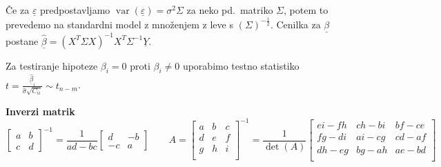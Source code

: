 \documentclass[11pt,a4paper]{amsart}
\theoremstyle{definition} %
\theoremstyle{plain} %
\newcommand{\Y}{\underline{Y}}
\newcommand{\ubeta}{\ensuremath{\underline{\beta}}}
\newcommand{\ueps}{\ensuremath{\underline{\varepsilon}}}
\DeclareMathOperator{\var}{var}
\begin{document}
Če za $\ueps$ predpostavljamo $\var(\ueps) = \sigma^2\Sigma$ za neko pd.\
matriko $\Sigma$, potem to prevedemo na standardni model z množenjem z leve s
$(\Sigma)^{-\frac12}$. Cenilka za $\ubeta$ postane $\hat{\ubeta} =
(X^T\Sigma X)^{-1}X^T\Sigma^{-1} \Y$.

Za testiranje hipoteze $\beta_i = 0$ proti $\beta_i \neq 0$ uporabimo testno
statistiko $t = \frac{\hat{\ubeta}_i}{\hat{\sigma} \sqrt{C_{ii}}} \sim t_{n-m}$.

\textbf{Inverzi matrik}
\[
  \begin{bmatrix}
    a & b \\ c & d
  \end{bmatrix}^{-1}
  =
  \frac{1}{ad - bc}
  \begin{bmatrix}
    d & -b \\ -c & a
  \end{bmatrix}
  \qquad A =
  \begin{bmatrix}
    a & b & c \\
    d & e & f \\
    g & h & i \\
  \end{bmatrix}^{-1}
 =
  \frac{1}{\det(A)}
\begin{bmatrix}
e i-f h & c h-b i & b f-c e \\
f g-d i & a i-c g & c d-a f \\
d h-e g & b g-a h & a e-b d \\
\end{bmatrix}
\]
\end{document}
